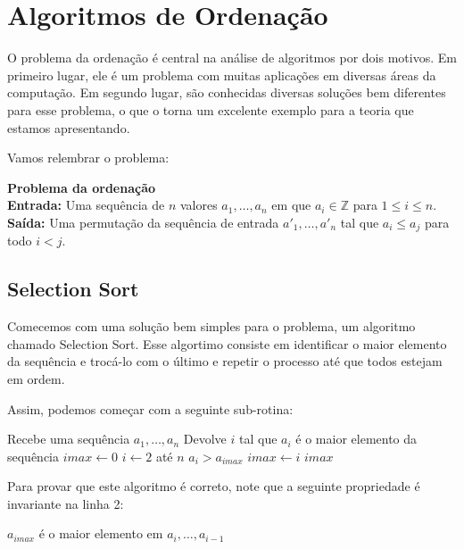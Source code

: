 \chapter{Algoritmos de Ordenação}

O problema da ordenação é central na análise de algoritmos por dois motivos.
Em primeiro lugar, ele é um problema com muitas aplicações em diversas áreas da computação.
Em segundo lugar, são conhecidas diversas soluções bem diferentes para esse problema, o que o torna um excelente exemplo para a teoria que estamos apresentando.

Vamos relembrar o problema:
\vspace{1em}

  {\bf Problema da ordenação}\\

  {\bf Entrada:} Uma sequência de $n$ valores $a_1, \dots, a_n$ em que $a_i \in \mathbb{Z}$ para $1 \leq i \leq n$.\\

  {\bf Saída:} Uma permutação da sequência de entrada $a'_1, \dots, a'_n$ tal que $a_i \leq a_j$ para todo $i < j$.

  \section{Selection Sort}

  Comecemos com uma solução bem simples para o problema, um algoritmo chamado Selection Sort.
  Esse algortimo consiste em identificar o maior elemento da sequência e trocá-lo com o último e repetir o processo até que todos estejam em ordem.

  Assim, podemos começar com a seguinte sub-rotina:

  \begin{codebox}
    \li \Comment Recebe uma sequência $a_1, \dots, a_n$
    \li \Comment Devolve $i$ tal que $a_i$ é o maior elemento da sequência
    \li $imax \gets 0$
    \li \For $i \gets 2$ até $n$
    \li \Do \If $a_i > a_{imax}$
    \li     \Then $imax \gets i$
        \End
    \End
    \li \Return $imax$
  \end{codebox}

  Para provar que este algoritmo é correto, note que a seguinte propriedade é invariante na linha 2:

  \begin{center}
    $a_{imax}$ é o maior elemento em $a_i, \dots, a_{i-1}$ 
  \end{center}

